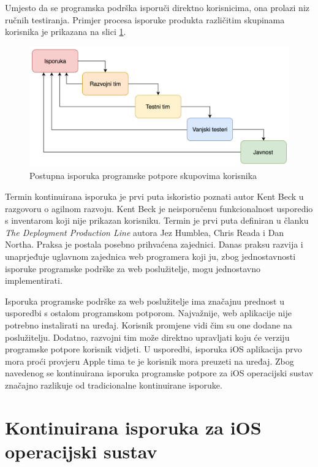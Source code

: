 \documentclass[times, utf8, diplomski, numeric]{fer}
\begin{document}
Umjesto da se programska podrška isporuči direktno korisnicima, ona prolazi niz ručnih testiranja. Primjer procesa isporuke produkta različitim skupinama korisnika je prikazana na slici \ref{fig:DeploymentStages}.

\begin{figure}[h]
\centering
\includegraphics[scale=0.6]{DeploymentStages}
\caption{Postupna isporuka programske potpore skupovima korisnika}
\label{fig:DeploymentStages}
\end{figure}

Termin kontinuirana isporuka je prvi puta iskoristio poznati autor Kent Beck u razgovoru o agilnom razvoju. Kent Beck je neisporučenu funkcionalnost usporedio s inventarom koji nije prikazan korisniku. Termin je prvi puta definiran u članku \textit{The Deployment Production Line} autora Jez Humblea, Chris Reada i Dan Northa. Praksa je postala posebno prihvaćena zajednici. Danas praksu razvija i unaprjeđuje uglavnom zajednica web programera koji ju, zbog jednostavnosti isporuke programske podrške za web poslužitelje, mogu jednostavno implementirati.

Isporuka programske podrške za web poslužitelje ima značajnu prednost u usporedbi s ostalom programskom potporom. Najvažnije, web aplikacije nije potrebno instalirati na uređaj. Korisnik promjene vidi čim su one dodane na poslužitelju. Dodatno, razvojni tim može direktno upravljati koju će verziju programske potpore korisnik vidjeti. U usporedbi, isporuka iOS aplikacija prvo mora proći provjeru Apple tima te je korisnik mora preuzeti na uređaj. Zbog navedenog se kontinuirana isporuka programske potpore za iOS operacijski sustav značajno razlikuje od tradicionalne kontinuirane isporuke.


\section{Kontinuirana isporuka za iOS operacijski sustav}
\end{document}
